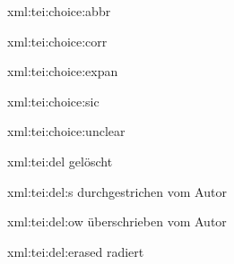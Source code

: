 \startxmlsetups xml:tei:choice:abbr
\stopxmlsetups

\startxmlsetups xml:tei:choice:corr
\stopxmlsetups

\startxmlsetups xml:tei:choice:expan
\stopxmlsetups

\startxmlsetups xml:tei:choice:sic
\stopxmlsetups

\startxmlsetups xml:tei:choice:unclear
	\FSBlfloor{}\FSBrceil
\stopxmlsetups

\startxmlsetups xml:tei:del
	\FSBtextapparat{||} %
	{\type{||}}{}{gelöscht} %
\stopxmlsetups

\startxmlsetups xml:tei:del:s
	\FSBtextapparat{||} %
	{\type{||}}{}{durchgestrichen vom Autor} %
\stopxmlsetups

\startxmlsetups xml:tei:del:ow
	\FSBtextapparat{||} %
	{\type{||}}{}{überschrieben vom Autor} %
\stopxmlsetups

\startxmlsetups xml:tei:del:erased
	\FSBtextapparat{||} %
	{\type{||}}{}{radiert} %
\stopxmlsetups


